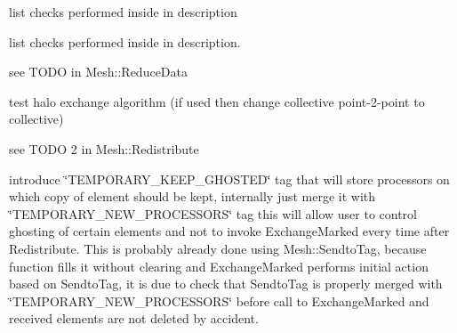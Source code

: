 \begin{DoxyRefList}
\item[\label{todo__todo000018}%
\hypertarget{todo__todo000018}{}%
Member \hyperlink{classINMOST_1_1Mesh_a55549e9d46cd92e2f3122e1516f3c9fd}{I\-N\-M\-O\-S\-T\-:\-:Mesh\-:\-:Begin\-Topology\-Check} (Element\-Type etype, const Handle\-Type $\ast$adj, enumerator num)]list checks performed inside in description  
\item[\label{todo__todo000019}%
\hypertarget{todo__todo000019}{}%
Member \hyperlink{classINMOST_1_1Mesh_a1c6c26bcbe6e7a0cba093c0b8312ba04}{I\-N\-M\-O\-S\-T\-:\-:Mesh\-:\-:End\-Topology\-Check} (Handle\-Type e)]list checks performed inside in description.  
\item[\label{todo__todo000012}%
\hypertarget{todo__todo000012}{}%
Member \hyperlink{classINMOST_1_1Mesh_aa3e1067bc3139bb0216f7ce3c1936734}{I\-N\-M\-O\-S\-T\-:\-:Mesh\-:\-:Exchange\-Data} (const Tag \&tag, Element\-Type mask, Marker\-Type select)]see T\-O\-D\-O in Mesh\-::\-Reduce\-Data 
\item[\label{todo__todo000014}%
\hypertarget{todo__todo000014}{}%
Member \hyperlink{classINMOST_1_1Mesh_ae44b9cfcb8964acbd710562df331a51a}{I\-N\-M\-O\-S\-T\-:\-:Mesh\-:\-:Exchange\-Marked} (enum Action action=A\-Ghost)]
\begin{DoxyEnumerate}
\item test halo exchange algorithm (if used then change collective point-\/2-\/point to collective)
\item see T\-O\-D\-O 2 in Mesh\-::\-Redistribute 
\end{DoxyEnumerate}
\item[\label{todo__todo000015}%
\hypertarget{todo__todo000015}{}%
Member \hyperlink{classINMOST_1_1Mesh_ade20ec7c8563e82bf8057bc47a3314b7}{I\-N\-M\-O\-S\-T\-:\-:Mesh\-:\-:Redistribute} ()]
\begin{DoxyEnumerate}
\item introduce \char`\"{}\-T\-E\-M\-P\-O\-R\-A\-R\-Y\-\_\-\-K\-E\-E\-P\-\_\-\-G\-H\-O\-S\-T\-E\-D\char`\"{} tag that will store processors on which copy of element should be kept, internally just merge it with \char`\"{}\-T\-E\-M\-P\-O\-R\-A\-R\-Y\-\_\-\-N\-E\-W\-\_\-\-P\-R\-O\-C\-E\-S\-S\-O\-R\-S\char`\"{} tag this will allow user to control ghosting of certain elements and not to invoke Exchange\-Marked every time after Redistribute. This is probably already done using Mesh\-::\-Sendto\-Tag, because function fills it without clearing and Exchange\-Marked performs initial action based on Sendto\-Tag, it is due to check that Sendto\-Tag is properly merged with \char`\"{}\-T\-E\-M\-P\-O\-R\-A\-R\-Y\-\_\-\-N\-E\-W\-\_\-\-P\-R\-O\-C\-E\-S\-S\-O\-R\-S\char`\"{} before call to Exchange\-Marked and received elements are not deleted by accident.

\end{DoxyEnumerate}
\end{DoxyRefList}
